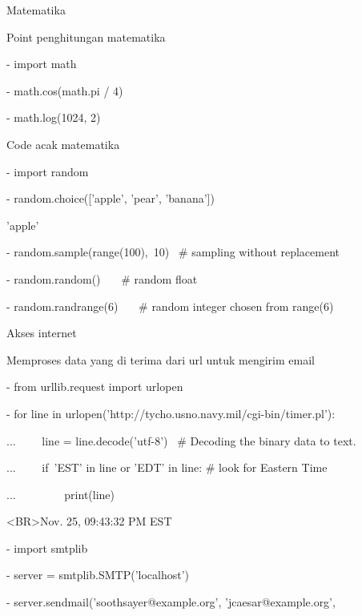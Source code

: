 \vspace{12pt}
\noindent 
Matematika  \par
\noindent 
Point penghitungan matematika \par
\noindent 
- import math \par
\noindent 
- math.cos(math.pi / 4) \par
{} \par
\noindent 
- math.log(1024, 2) \par
{} \par
\noindent 
Code acak matematika \par
\noindent 
- import random \par
\noindent 
- random.choice(['apple', 'pear', 'banana']) \par
\noindent 
'apple' \par
\noindent 
- random.sample(range(100),~10)~   $  \#  $ sampling without replacement \par
\noindent 
[30, 83, 16, 4, 8, 81, 41, 50, 18, 33] \par
\noindent 
- random.random()~~~  $  \#  $ random float \par
{} \par
\noindent 
- random.randrange(6)~~~  $  \#  $ random integer chosen from range(6) \par
{} \par
\noindent 
Akses internet \par
\noindent 
Memproses data yang di terima dari url untuk mengirim email \par
\noindent 
- from urllib.request import urlopen \par
\noindent 
- for line in urlopen('http://tycho.usno.navy.mil/cgi-bin/timer.pl'): \par
\noindent 
...~~~~ line = line.decode('utf-8')~  $  \#  $ Decoding the binary data to text. \par
\noindent 
...~~~~ if~'EST' in line or 'EDT' in line:   $  \#  $ look for Eastern Time \par
\noindent 
...~~~~~~~~ print(line) \par
\noindent 
<BR>Nov. 25, 09:43:32 PM EST \par
\noindent 
- import smtplib \par
\noindent 
- server = smtplib.SMTP('localhost') \par
\noindent 
- server.sendmail('soothsayer@example.org', 'jcaesar@example.org', \par
\noindent 
